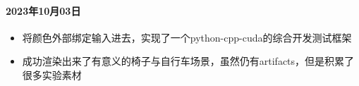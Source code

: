 \paragraph{2023年10月03日}
\begin{itemize}
    \item 将颜色外部绑定输入进去，实现了一个python-cpp-cuda的综合开发测试框架
    \item 成功渲染出来了有意义的椅子与自行车场景，虽然仍有artifacts，但是积累了很多实验素材
\end{itemize}
